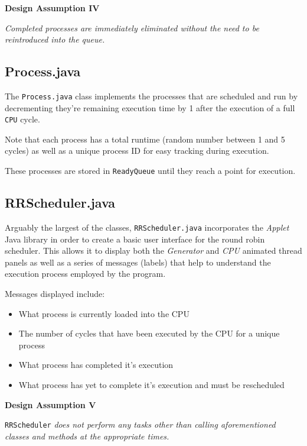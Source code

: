 \documentclass[]{report}
\begin{document}
\begin{mdframed}[backgroundcolor=lightgray!40]
	\textbf{Design Assumption IV} \par 
	\textit{Completed processes are immediately eliminated without the need to be reintroduced into the queue.}
\end{mdframed}

\vspace{2mm}

\subsection*{Process.java}
The \verb|Process.java| class implements the processes that are scheduled and run by decrementing they're remaining execution time by 1 after the execution of a full \verb|CPU| cycle. \par 
Note that each process has a total runtime (random number between 1 and 5 cycles) as well as a unique process ID for easy tracking during execution. \par 
These processes are stored in \verb|ReadyQueue| until they reach a point for execution.

\vspace{2mm}

\subsection*{RRScheduler.java}
Arguably the largest of the classes, \verb|RRScheduler.java| incorporates the \textit{Applet} Java library in order to create a basic user interface for the round robin scheduler. This allows it to display both the \textit{Generator} and \textit{CPU} animated thread panels as well as a series of messages (labels) that help to understand the execution process employed by the program. \par 
Messages displayed include:
\begin{itemize}
	\item What process is currently loaded into the CPU
	\item The number of cycles that have been executed by the CPU for a unique process
	\item What process has completed it's execution 
	\item What process has yet to complete it's execution and must be rescheduled
\end{itemize}

\begin{mdframed}[backgroundcolor=lightgray!40]
	\textbf{Design Assumption V} \par 
	\verb|RRScheduler| \textit{does not perform any tasks other than calling aforementioned classes and methods at the appropriate times.}
\end{mdframed}
\end{document}
